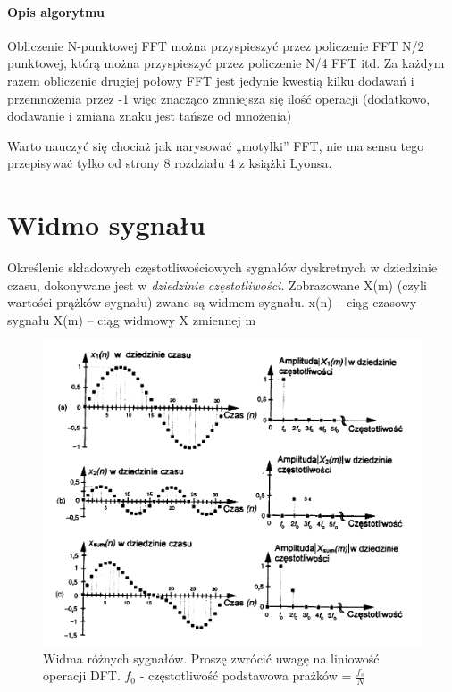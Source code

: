 \documentclass[a4paper,twoside]{report}
\begin{document}
\paragraph{Opis algorytmu}
Obliczenie N-punktowej FFT można przyspieszyć przez policzenie FFT N/2 punktowej, którą można przyspieszyć przez policzenie N/4 FFT itd. Za każdym razem obliczenie drugiej połowy FFT jest jedynie kwestią kilku dodawań i przemnożenia przez -1 więc znacząco zmniejsza się ilość operacji (dodatkowo, dodawanie i zmiana znaku jest tańsze od mnożenia)

Warto nauczyć się chociaż jak narysować „motylki” FFT, nie ma sensu tego przepisywać tylko od strony 8 rozdziału 4 z książki Lyonsa.

\newpage
\section{Widmo sygnału}
Określenie składowych częstotliwościowych sygnałów dyskretnych w dziedzinie czasu, dokonywane jest w \textit{ dziedzinie częstotliwości}. Zobrazowane X(m) (czyli wartości prążków sygnału) zwane są widmem sygnału.
x(n) – ciąg czasowy sygnału
X(m) – ciąg widmowy X zmiennej m

\begin{figure}[htbp]
	\centering
	\includegraphics[scale=0.7]{obrazy/fourier/widmo.png}
	\caption{Widma różnych sygnałów. Proszę zwrócić uwagę na liniowość operacji DFT. 
		$ f_0 $ - częstotliwość podstawowa prażków = $ \frac{f_s}{N} $ }
\end{figure}
\end{document}

